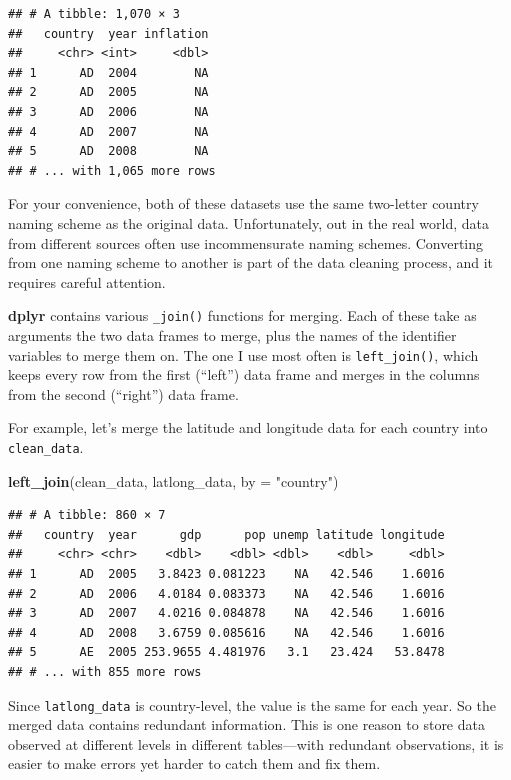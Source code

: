 \documentclass[12pt,oneside,openany]{book}
\newenvironment{Shaded}{\begin{snugshade}}{\end{snugshade}}
\newcommand{\KeywordTok}[1]{\textcolor[rgb]{0.13,0.29,0.53}{\textbf{{#1}}}}
\newcommand{\DataTypeTok}[1]{\textcolor[rgb]{0.13,0.29,0.53}{{#1}}}
\newcommand{\StringTok}[1]{\textcolor[rgb]{0.31,0.60,0.02}{{#1}}}
\newcommand{\NormalTok}[1]{{#1}}
\begin{document}
\begin{verbatim}
## # A tibble: 1,070 × 3
##   country  year inflation
##     <chr> <int>     <dbl>
## 1      AD  2004        NA
## 2      AD  2005        NA
## 3      AD  2006        NA
## 4      AD  2007        NA
## 5      AD  2008        NA
## # ... with 1,065 more rows
\end{verbatim}

For your convenience, both of these datasets use the same two-letter
country naming scheme as the original data. Unfortunately, out in the
real world, data from different sources often use incommensurate naming
schemes. Converting from one naming scheme to another is part of the
data cleaning process, and it requires careful attention.

\textbf{dplyr} contains various \texttt{\_join()} functions for merging.
Each of these take as arguments the two data frames to merge, plus the
names of the identifier variables to merge them on. The one I use most
often is \texttt{left\_join()}, which keeps every row from the first
(``left'') data frame and merges in the columns from the second
(``right'') data frame.

For example, let's merge the latitude and longitude data for each
country into \texttt{clean\_data}.

\begin{Shaded}
\begin{Highlighting}[]
\KeywordTok{left_join}\NormalTok{(clean_data,}
          \NormalTok{latlong_data,}
          \DataTypeTok{by =} \StringTok{"country"}\NormalTok{)}
\end{Highlighting}
\end{Shaded}

\begin{verbatim}
## # A tibble: 860 × 7
##   country  year      gdp      pop unemp latitude longitude
##     <chr> <chr>    <dbl>    <dbl> <dbl>    <dbl>     <dbl>
## 1      AD  2005   3.8423 0.081223    NA   42.546    1.6016
## 2      AD  2006   4.0184 0.083373    NA   42.546    1.6016
## 3      AD  2007   4.0216 0.084878    NA   42.546    1.6016
## 4      AD  2008   3.6759 0.085616    NA   42.546    1.6016
## 5      AE  2005 253.9655 4.481976   3.1   23.424   53.8478
## # ... with 855 more rows
\end{verbatim}

Since \texttt{latlong\_data} is country-level, the value is the same for
each year. So the merged data contains redundant information. This is
one reason to store data observed at different levels in different
tables---with redundant observations, it is easier to make errors yet
harder to catch them and fix them.
\end{document}
